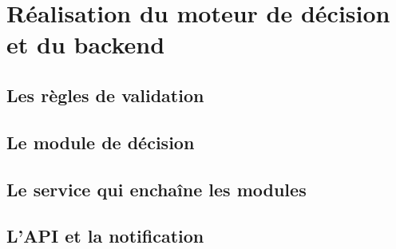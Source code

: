 
\section{Réalisation du moteur de décision et du backend}


\subsection{Les règles de validation}

\subsection{Le module de décision}

\subsection{Le service qui enchaîne les modules}

\subsection{L'API et la notification}
